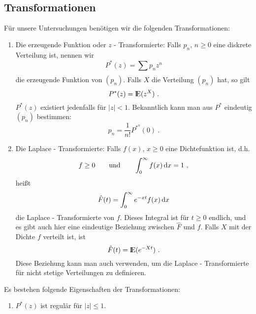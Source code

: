 \begin{appendix}
\chapter{Transformationen}
Für unsere Untersuchungen benötigen wir die folgenden Transformationen:
\begin{enumerate}
\item Die erzeugende Funktion oder $z$ - Transformierte: Falls $p_{n}$, $n
\geq 0$ eine diskrete Verteilung ist, nennen wir
\begin{displaymath}
P^{*}(z) = \sum_{}^{} p_{n} z^{n}
\end{displaymath}
die erzeugende Funktion von $(p_{n})$. Falls $X$ die Verteilung $(p_{n})$
hat, so gilt
\begin{displaymath}
P^{*}(z) = {\rm I\kern-0.2em E} (z^{X}) ~.
\end{displaymath}
$P^{*}(z)$ existiert jedenfalls für $|z|<1$. Bekanntlich kann man aus
$P^{*}$ eindeutig $(p_{n})$ bestimmen:
\begin{displaymath}
p_{n} = \frac{1}{n!} P^{*^{n}} (0) ~.
\end{displaymath}
\item Die Laplace - Transformierte: Falls $f(x)$, $x \geq 0$ eine
Dichtefunktion ist, d.h.
\begin{displaymath}
f \geq 0 \qquad \mbox{und} \qquad \int_{0}^{\infty} f(x)\mathop{}\!\mathrm{d} x = 1 ~,
\end{displaymath}
heißt
\begin{displaymath}
\hat F(t) = \int_{0}^{\infty} e^{-xt} f(x) \mathop{}\!\mathrm{d} x
\end{displaymath}
die Laplace - Transformierte von $f$. Dieses Integral ist für $t \geq 0$
endlich, und es gibt auch hier eine eindeutige Beziehung zwischen $\hat F$
und $f$. Falls $X$ mit der Dichte $f$ verteilt ist, ist
\begin{displaymath}
\hat F(t) = {\rm I\kern-0.2em E} (e^{-Xt}) ~.
\end{displaymath}
Diese Beziehung kann man auch verwenden, um die Laplace - Transformierte
für nicht stetige Verteilungen zu definieren.
\end{enumerate}
Es bestehen folgende Eigenschaften der Transformationen:
\begin{enumerate}
\item $P^{*}(z)$ ist regulär für $|z| \leq 1$.

\end{enumerate}
\end{appendix}
